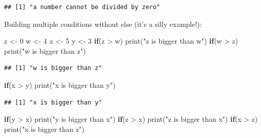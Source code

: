 \documentclass[
]{book}
\newenvironment{Shaded}{\begin{snugshade}}{\end{snugshade}}
\newcommand{\ControlFlowTok}[1]{\textcolor[rgb]{0.13,0.29,0.53}{\textbf{#1}}}
\newcommand{\DecValTok}[1]{\textcolor[rgb]{0.00,0.00,0.81}{#1}}
\newcommand{\FunctionTok}[1]{\textcolor[rgb]{0.00,0.00,0.00}{#1}}
\newcommand{\NormalTok}[1]{#1}
\newcommand{\OtherTok}[1]{\textcolor[rgb]{0.56,0.35,0.01}{#1}}
\newcommand{\SpecialCharTok}[1]{\textcolor[rgb]{0.00,0.00,0.00}{#1}}
\newcommand{\StringTok}[1]{\textcolor[rgb]{0.31,0.60,0.02}{#1}}
\theoremstyle{definition}
\theoremstyle{definition}
\theoremstyle{definition}
\theoremstyle{definition}
\theoremstyle{remark}
\begin{document}
\begin{verbatim}
## [1] "a number cannot be divided by zero"
\end{verbatim}

Building multiple conditions without else (it's a silly example!):

\begin{Shaded}
\begin{Highlighting}[]
\NormalTok{z }\OtherTok{\textless{}{-}} \DecValTok{0}
\NormalTok{w }\OtherTok{\textless{}{-}} \DecValTok{4}
\NormalTok{x }\OtherTok{\textless{}{-}} \DecValTok{5}
\NormalTok{y }\OtherTok{\textless{}{-}} \DecValTok{3}
\ControlFlowTok{if}\NormalTok{(z }\SpecialCharTok{\textgreater{}}\NormalTok{ w) }\FunctionTok{print}\NormalTok{(}\StringTok{"z is bigger than w"}\NormalTok{)}
\ControlFlowTok{if}\NormalTok{(w }\SpecialCharTok{\textgreater{}}\NormalTok{ z) }\FunctionTok{print}\NormalTok{(}\StringTok{"w is bigger than z"}\NormalTok{)}
\end{Highlighting}
\end{Shaded}

\begin{verbatim}
## [1] "w is bigger than z"
\end{verbatim}

\begin{Shaded}
\begin{Highlighting}[]
\ControlFlowTok{if}\NormalTok{(x }\SpecialCharTok{\textgreater{}}\NormalTok{ y) }\FunctionTok{print}\NormalTok{(}\StringTok{"x is bigger than y"}\NormalTok{)}
\end{Highlighting}
\end{Shaded}

\begin{verbatim}
## [1] "x is bigger than y"
\end{verbatim}

\begin{Shaded}
\begin{Highlighting}[]
\ControlFlowTok{if}\NormalTok{(y }\SpecialCharTok{\textgreater{}}\NormalTok{ x) }\FunctionTok{print}\NormalTok{(}\StringTok{"y is bigger than x"}\NormalTok{)}
\ControlFlowTok{if}\NormalTok{(z }\SpecialCharTok{\textgreater{}}\NormalTok{ x) }\FunctionTok{print}\NormalTok{(}\StringTok{"z is bigger than x"}\NormalTok{)}
\ControlFlowTok{if}\NormalTok{(x }\SpecialCharTok{\textgreater{}}\NormalTok{ z) }\FunctionTok{print}\NormalTok{(}\StringTok{"x is bigger than z"}\NormalTok{)}
\end{Highlighting}
\end{Shaded}
\end{document}
